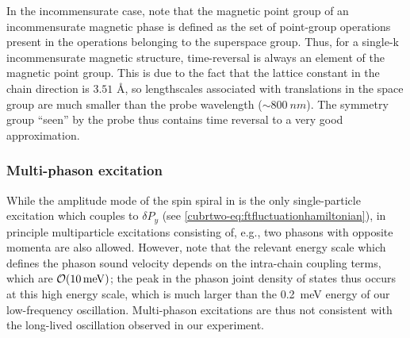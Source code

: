 In the incommensurate case, note that the magnetic point group of an incommensurate magnetic phase is defined as the set of point-group operations present in the operations belonging to the superspace group.
Thus, for a single-k incommensurate magnetic structure, time-reversal is always an element of the magnetic point group.
This is due to the fact that the lattice constant in the chain direction is $3.51$ \si{\angstrom}, so lengthscales associated with translations in the space group are much smaller than the probe wavelength ($\sim\qty{800}{nm}$).
The symmetry group ``seen'' by the probe thus contains time reversal to a very good approximation.

\subsubsection{Multi-phason excitation}

While the amplitude mode of the spin spiral in  is the only single-particle excitation which couples to $\delta P_y$ (see \cref{cubrtwo-eq:ftfluctuationhamiltonian}), in principle multiparticle excitations consisting of, e.g., two phasons with opposite momenta are also allowed.
However, note that the relevant energy scale which defines the phason sound velocity depends on the intra-chain coupling terms, which are $\mathcal{O}(\qty{10}{meV})$; the peak in the phason joint density of states thus occurs at this high energy scale, which is much larger than the \qty{0.2}{meV} energy of our low-frequency oscillation.
Multi-phason excitations are thus not consistent with the long-lived oscillation observed in our experiment.
